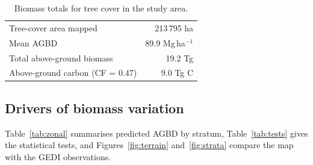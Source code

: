 \documentclass[11pt,a4paper]{article}
\newcommand{\mgha}{Mg\,ha$^{-1}$}
\begin{document}
\begin{table}[htbp]
\centering
\caption{Biomass totals for tree cover in the study area.}
\label{tab:totals}
\small
\begin{tabular}{l r}
\toprule
Tree-cover area mapped & 213\,795 ha \\
Mean AGBD & 89.9 \mgha{} \\
Total above-ground biomass & 19.2 Tg \\
Above-ground carbon (CF = 0.47) & 9.0 Tg C \\
\bottomrule
\end{tabular}
\end{table}

\subsection{Drivers of biomass variation}

Table~\ref{tab:zonal} summarises predicted AGBD by stratum, Table~\ref{tab:tests} gives the
statistical tests, and Figures~\ref{fig:terrain} and~\ref{fig:strata} compare the map with the
GEDI observations.
\end{document}
